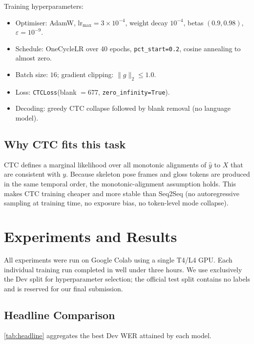\documentclass[11pt,a4paper]{article}
\newcommand{\Cref}[1]{\ref{#1}}
\begin{document}
Training hyperparameters:
\begin{itemize}
  \item Optimiser: AdamW, $\mathrm{lr}_{\max}=3\times 10^{-4}$, weight decay $10^{-4}$, betas $(0.9, 0.98)$, $\varepsilon=10^{-9}$.
  \item Schedule: OneCycleLR over 40 epochs, \texttt{pct\_start=0.2}, cosine annealing to almost zero.
  \item Batch size: $16$; gradient clipping: $\|g\|_2 \le 1.0$.
  \item Loss: \texttt{CTCLoss}(blank $=677$, \texttt{zero\_infinity=True}).
  \item Decoding: greedy CTC collapse followed by blank removal (no language model).
\end{itemize}

\subsection{Why CTC fits this task}
CTC defines a marginal likelihood over all monotonic alignments of $\hat y$ to $X$ that are consistent with $y$. Because skeleton pose frames and gloss tokens are produced in the same temporal order, the monotonic-alignment assumption holds. This makes CTC training cheaper and more stable than Seq2Seq (no autoregressive sampling at training time, no exposure bias, no token-level mode collapse).

\section{Experiments and Results}

All experiments were run on Google Colab using a single T4/L4 GPU. Each individual training run completed in well under three hours. We use exclusively the Dev split for hyperparameter selection; the official test split contains no labels and is reserved for our final submission.

\subsection{Headline Comparison}
\Cref{tab:headline} aggregates the best Dev WER attained by each model.
\end{document}
